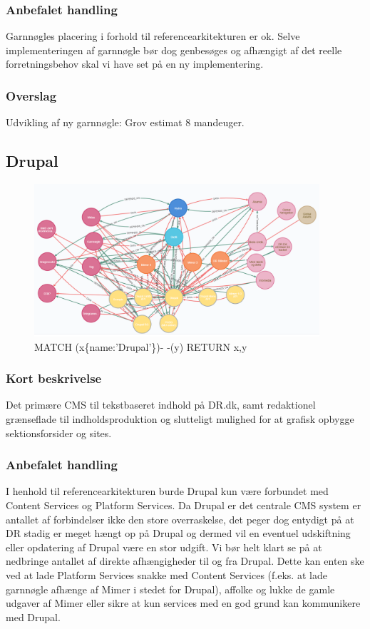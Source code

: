 \documentclass{article}
\begin{document}
\subsubsection{Anbefalet handling}
Garnnøgles placering i forhold til referencearkitekturen er ok. Selve implementeringen af garnnøgle bør dog genbesøges og afhængigt af det reelle forretningsbehov skal vi have set på en ny implementering.
\subsubsection{Overslag}
Udvikling af ny garnnøgle: Grov estimat 8 mandeuger.


\subsection{Drupal}
\begin{figure}[h]
\includegraphics[width=300pt]{Drupal.PNG}
\caption{MATCH (x\{name:'Drupal'\})- -(y) RETURN x,y}
\end{figure}
\subsubsection{Kort beskrivelse}
Det primære CMS til tekstbaseret indhold på DR.dk, samt redaktionel grænseflade til indholdsproduktion og slutteligt mulighed for at grafisk opbygge sektionsforsider og sites.
\subsubsection{Anbefalet handling}
I henhold til referencearkitekturen burde Drupal kun være forbundet med Content Services og Platform Services. Da Drupal er det centrale CMS system er antallet af forbindelser ikke den store overraskelse, det peger dog entydigt på at DR stadig er meget hængt op på Drupal og dermed vil en eventuel udskiftning eller opdatering af Drupal være en stor udgift.
Vi bør helt klart se på at nedbringe antallet af direkte afhængigheder til og fra Drupal. 
Dette kan enten ske ved at lade Platform Services snakke med Content Services (f.eks. at lade garnnøgle afhænge af Mimer i stedet for Drupal), affolke og lukke de gamle udgaver af Mimer eller sikre at kun services med en god grund kan kommunikere med Drupal.
\end{document}
